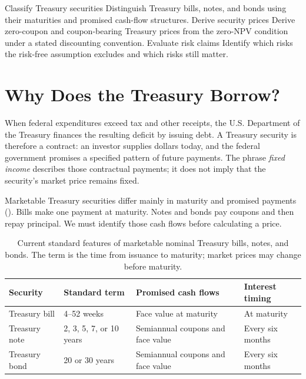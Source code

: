 \documentclass[11pt]{article}
\begin{document}

\learningobjectives
  {Classify Treasury securities}
  {Distinguish Treasury bills, notes, and bonds using their maturities and promised cash-flow structures.}
  {Derive security prices}
  {Derive zero-coupon and coupon-bearing Treasury prices from the zero-NPV condition under a stated discounting convention.}
  {Evaluate risk claims}
  {Identify which risks the risk-free assumption excludes and which risks still matter.}

\section{Why Does the Treasury Borrow?}

When federal expenditures exceed tax and other receipts, the U.S. Department of the Treasury finances the resulting deficit by issuing debt. A Treasury security is therefore a contract: an investor supplies dollars today, and the federal government promises a specified pattern of future payments. The phrase \emph{fixed income} describes those contractual payments; it does not imply that the security's market price remains fixed.

Marketable Treasury securities differ mainly in maturity and promised payments (). Bills make one payment at maturity. Notes and bonds pay coupons and then repay principal. We must identify those cash flows before calculating a price.

\begin{table}[ht]
  \centering
  \caption{Current standard features of marketable nominal Treasury bills, notes, and bonds. The term is the time from issuance to maturity; market prices may change before maturity.}
  \label{tab:treasury-classes}
  \small\sffamily
  \renewcommand{\arraystretch}{1.2}
  \begin{tabular}{@{}p{}p{}p{}p{}@{}}
    \hline
    \textbf{Security} & \textbf{Standard term} & \textbf{Promised cash flows} & \textbf{Interest timing} \\
    \hline
    Treasury bill & 4--52 weeks & Face value at maturity & At maturity \\
    Treasury note & 2, 3, 5, 7, or 10 years & Semiannual coupons and face value & Every six months \\
    Treasury bond & 20 or 30 years & Semiannual coupons and face value & Every six months \\
    \hline
  \end{tabular}
\end{table}
\end{document}
